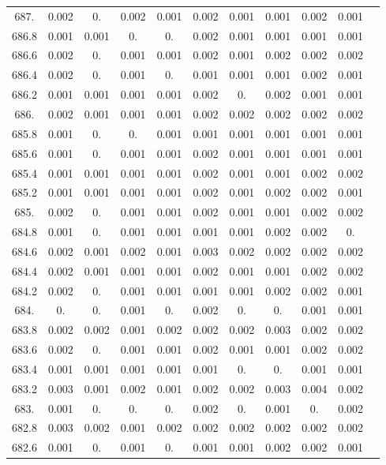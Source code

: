 \documentclass[12pt]{ctexart}
\numberwithin{equation}{section}
\begin{document}
\begin{longtable}{ccccccccccc}
687.	&	0.002	&	0.	&	0.002	&	0.001	&	0.002	&	0.001	&	0.001	&	0.002	&	0.001	\\
686.8	&	0.001	&	0.001	&	0.	&	0.	&	0.002	&	0.001	&	0.001	&	0.001	&	0.001	\\
686.6	&	0.002	&	0.	&	0.001	&	0.001	&	0.002	&	0.001	&	0.002	&	0.002	&	0.002	\\
686.4	&	0.002	&	0.	&	0.001	&	0.	&	0.001	&	0.001	&	0.001	&	0.002	&	0.001	\\
686.2	&	0.001	&	0.001	&	0.001	&	0.001	&	0.002	&	0.	&	0.002	&	0.001	&	0.001	\\
686.	&	0.002	&	0.001	&	0.001	&	0.001	&	0.002	&	0.002	&	0.002	&	0.002	&	0.002	\\
685.8	&	0.001	&	0.	&	0.	&	0.001	&	0.001	&	0.001	&	0.001	&	0.001	&	0.001	\\
685.6	&	0.001	&	0.	&	0.001	&	0.001	&	0.002	&	0.001	&	0.001	&	0.001	&	0.001	\\
685.4	&	0.001	&	0.001	&	0.001	&	0.001	&	0.002	&	0.001	&	0.001	&	0.002	&	0.002	\\
685.2	&	0.001	&	0.001	&	0.001	&	0.001	&	0.002	&	0.001	&	0.002	&	0.002	&	0.001	\\
685.	&	0.002	&	0.	&	0.001	&	0.001	&	0.002	&	0.001	&	0.001	&	0.002	&	0.002	\\
684.8	&	0.001	&	0.	&	0.001	&	0.001	&	0.001	&	0.001	&	0.002	&	0.002	&	0.	\\
684.6	&	0.002	&	0.001	&	0.002	&	0.001	&	0.003	&	0.002	&	0.002	&	0.002	&	0.002	\\
684.4	&	0.002	&	0.001	&	0.001	&	0.001	&	0.002	&	0.001	&	0.001	&	0.002	&	0.002	\\
684.2	&	0.002	&	0.	&	0.001	&	0.001	&	0.001	&	0.001	&	0.002	&	0.002	&	0.001	\\
684.	&	0.	&	0.	&	0.001	&	0.	&	0.002	&	0.	&	0.	&	0.001	&	0.001	\\
683.8	&	0.002	&	0.002	&	0.001	&	0.002	&	0.002	&	0.002	&	0.003	&	0.002	&	0.002	\\
683.6	&	0.002	&	0.	&	0.001	&	0.001	&	0.002	&	0.001	&	0.001	&	0.002	&	0.002	\\
683.4	&	0.001	&	0.001	&	0.001	&	0.001	&	0.001	&	0.	&	0.	&	0.001	&	0.001	\\
683.2	&	0.003	&	0.001	&	0.002	&	0.001	&	0.002	&	0.002	&	0.003	&	0.004	&	0.002	\\
683.	&	0.001	&	0.	&	0.	&	0.	&	0.002	&	0.	&	0.001	&	0.	&	0.002	\\
682.8	&	0.003	&	0.002	&	0.001	&	0.002	&	0.002	&	0.002	&	0.002	&	0.002	&	0.002	\\
682.6	&	0.001	&	0.	&	0.001	&	0.	&	0.001	&	0.001	&	0.002	&	0.002	&	0.001	\\

\end{longtable}
\end{document}
